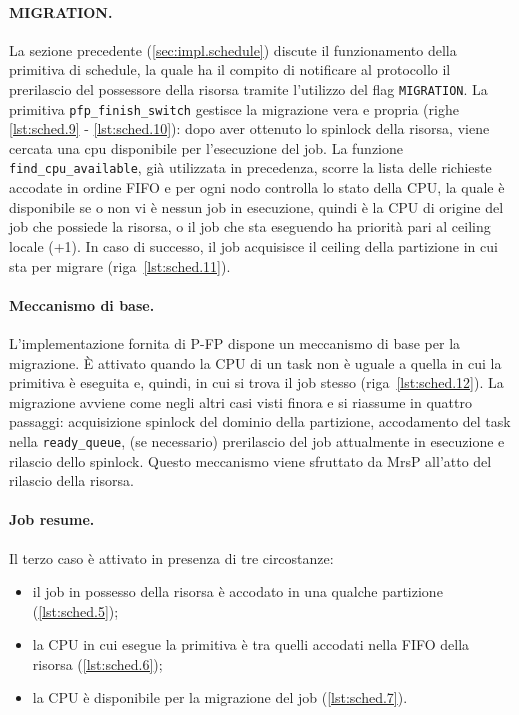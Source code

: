 \paragraph{MIGRATION.} La sezione precedente (\ref{sec:impl.schedule}) discute il funzionamento della primitiva di schedule, la quale ha il compito di notificare al protocollo il prerilascio del possessore della risorsa tramite l'utilizzo del flag \texttt{MIGRATION}. La primitiva \texttt{pfp\_finish\_switch} gestisce la migrazione vera e propria (righe \ref{lst:sched.9} - \ref{lst:sched.10}): dopo aver ottenuto lo spinlock della risorsa, viene cercata una cpu disponibile per l'esecuzione del job. La funzione \texttt{find\_cpu\_available}, già utilizzata in precedenza, scorre la lista delle richieste accodate in ordine FIFO e per ogni nodo controlla lo stato della CPU, la quale è disponibile se o non vi è nessun job in esecuzione, quindi è la CPU di origine del job che possiede la risorsa, o il job che sta eseguendo ha priorità pari al ceiling locale (+1). In caso di successo, il job acquisisce il ceiling della partizione in cui sta per migrare (riga~\ref{lst:sched.11}).

\paragraph{Meccanismo di base.} L'implementazione fornita di P-FP dispone un meccanismo di base per la migrazione. \`E attivato quando la CPU di un task non è uguale a quella in cui la primitiva è eseguita e, quindi, in cui si trova il job stesso (riga~\ref{lst:sched.12}). La migrazione avviene come negli altri casi visti finora e si riassume in quattro passaggi: acquisizione spinlock del dominio della partizione, accodamento del task nella \texttt{ready\_queue}, (se necessario) prerilascio del job attualmente in esecuzione e rilascio dello spinlock. Questo meccanismo viene sfruttato da MrsP all'atto del rilascio della risorsa.

\paragraph{Job resume.} Il terzo caso è attivato in presenza di tre circostanze:

\begin{itemize}
\item il job in possesso della risorsa è accodato in una qualche partizione (\ref{lst:sched.5});
\item la CPU in cui esegue la primitiva è tra quelli accodati nella FIFO della risorsa (\ref{lst:sched.6});
\item la CPU è disponibile per la migrazione del job (\ref{lst:sched.7}).
\end{itemize}


